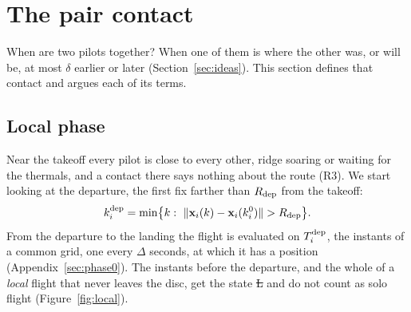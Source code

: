 \section{The pair contact}\label{sec:contact}

When are two pilots together? When one of them is where the other was, or will be, at most
$\delta$ earlier or later (Section~\ref{sec:ideas}). This section defines that contact and argues
each of its terms.

\subsection{Local phase}\label{sec:local}

Near the takeoff every pilot is close to every other, ridge soaring or waiting for the thermals,
and a contact there says nothing about the route (R3). We start looking at the departure, the
first fix farther than $R_{\mathrm{dep}}$ from the takeoff:
\begin{equation}\label{eq:departure}
  k^{\mathrm{dep}}_i = \min\bigl\{k:\ \|\mathbf{x}_i(k)-\mathbf{x}_i(k^0_i)\| > R_{\mathrm{dep}}\bigr\}.
\end{equation}
From the departure to the landing the flight is evaluated on $T^{\mathrm{dep}}_i$, the instants of a common
grid, one every $\Delta$ seconds, at which it has a position (Appendix~\ref{sec:phase0}). The
instants before the departure, and the whole of a \emph{local} flight that never leaves the disc,
get the state \st{L} and do not count as solo flight (Figure~\ref{fig:local}).

